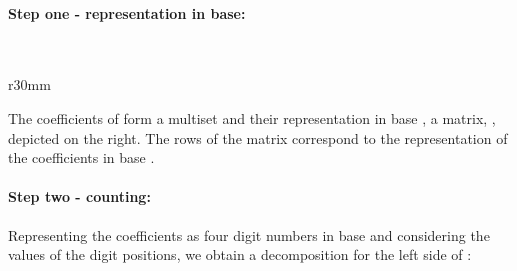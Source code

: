\documentclass[envcountsame]{llncs}
\begin{document}
\vspace{-2mm}
\paragraph{\textbf{Step one - representation in base:}}~\\
\vspace{-3mm}
\begin{wrapfigure}{r}{30mm}\vspace{-17mm}

\vspace{-13mm}
\end{wrapfigure}
\noindent
The coefficients of  form a multiset 
and their representation in base , a  matrix,
, depicted on the right. The  rows of the matrix
correspond to  the representation of the coefficients
 in base .



\vspace{-2mm}
\paragraph{\textbf{Step two - counting:}}

Representing the coefficients as four digit numbers in base
 and considering the values
 of the digit positions, we obtain a
decomposition for the left side of :
\end{document}

